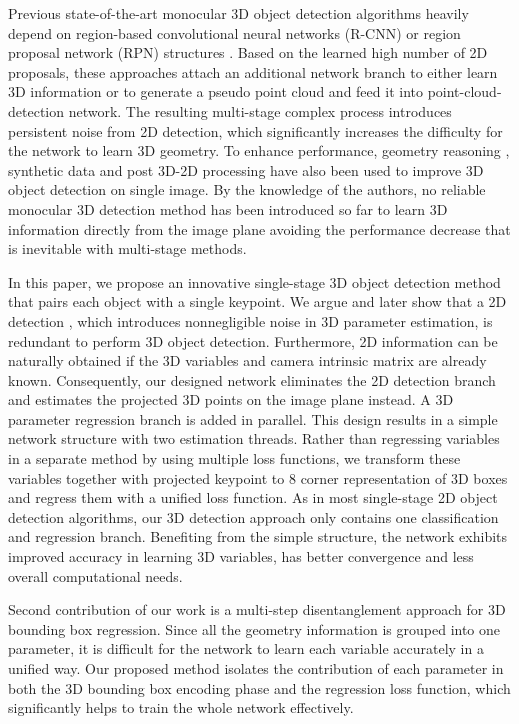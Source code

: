 \documentclass[10pt,twocolumn,letterpaper]{article}
\begin{document}
    Previous state-of-the-art monocular 3D object detection algorithms \cite{monogr2019, m3drpn_2019, am3d_2019} heavily depend on region-based convolutional neural networks (R-CNN) or region proposal network (RPN) structures \cite{faster_rcnn_2015, retinanet_2017, mask_rcnn_2017}. Based on the learned high number of 2D proposals, these approaches attach an additional network branch to either learn 3D information or to generate a pseudo point cloud and feed it into point-cloud-detection network. The resulting multi-stage complex process introduces persistent noise from 2D detection, which significantly increases the difficulty for the network to learn 3D geometry. To enhance performance, geometry reasoning \cite{monogr2019}, synthetic data \cite{roi10d_2019} and post 3D-2D processing \cite{m3drpn_2019} have also been used to improve 3D object detection on single image. By the knowledge of the authors, no reliable monocular 3D detection method has been introduced so far to learn 3D information directly from the image plane avoiding the performance decrease that is inevitable with multi-stage methods.


    In this paper, we propose an innovative single-stage 3D object detection method that pairs each object with a single keypoint. We argue and later show that a 2D detection , which introduces nonnegligible noise in 3D parameter estimation, is redundant to perform 3D object detection. Furthermore, 2D information can be naturally obtained if the 3D variables and camera intrinsic matrix are already known. Consequently, our designed network eliminates the 2D detection branch and estimates the projected 3D points on the image plane instead. A 3D parameter regression branch is added in parallel. This design results in a simple network structure with two estimation threads. Rather than regressing variables in a separate method by using multiple loss functions, we transform these variables together with projected keypoint to 8 corner representation of 3D boxes and regress them with a unified loss function. As in most single-stage 2D object detection algorithms, our 3D detection approach only contains one classification and regression branch. Benefiting from the simple structure, the network exhibits improved accuracy in learning 3D variables, has better convergence and less overall computational needs.
    
    Second contribution of our work is a multi-step disentanglement approach for 3D bounding box regression. Since all the geometry information is grouped into one parameter, it is difficult for the network to learn each variable accurately in a unified way. Our proposed method isolates the contribution of each parameter in both the 3D bounding box encoding phase and the regression loss function, which significantly helps to train the whole network effectively.
    
\end{document}
